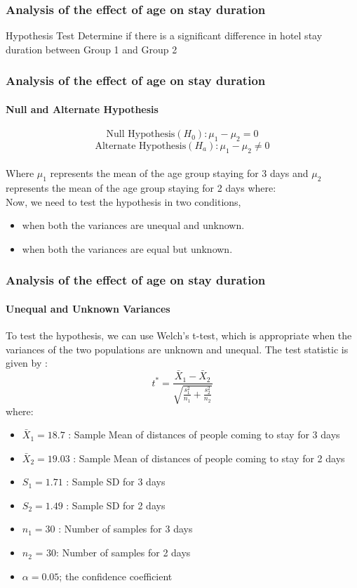 \documentclass{beamer}
\begin{document}
\begin{frame}
\frametitle{Analysis of the effect of age on
stay duration}
\begin{block}{Hypothesis Test}
Determine if there is a significant difference in hotel stay duration between Group 1 and Group 2
\end{block}
\end{frame}

\begin{frame}
\frametitle{Analysis of the effect of age on
stay duration}
\framesubtitle{Null and Alternate Hypothesis}
$$\text{Null Hypothesis}(H_0): \mu_1 - \mu_2 = 0$$
$$\text{Alternate Hypothesis}(H_a): \mu_1 - \mu_2 \neq 0$$\\
\vspace{5mm}
Where $\mu_1$ represents the mean of the age group staying for 3 days and $\mu_2$ represents the mean of the age group staying for 2 days
where:
\\ \vspace{5mm}
Now, we need to test the hypothesis in two conditions,
\begin{itemize}
    \item when both the variances are unequal and unknown.
    \item when both the variances are equal but unknown.
\end{itemize}

\end{frame}

\begin{frame}
\frametitle{Analysis of the effect of age on
stay duration}
\framesubtitle{Unequal and Unknown Variances}
To test the hypothesis, we can use Welch’s t-test, which is appropriate when the variances of the two populations are unknown and unequal. The test statistic is given by :
\[ t^* = \frac{\bar{X}_1 - \bar{X}_2}{\sqrt{\frac{s_1^2}{n_1} + \frac{s_2^2}{n_2}}} \]
where:
\begin{itemize}
    \item $\bar{X}_1 = 18.7$ : Sample Mean of distances of people coming to stay for 3 days
    \item $\bar{X}_2 = 19.03$ : Sample Mean of distances of people coming to stay for 2 days
    \item $S_1 = 1.71$ : Sample SD for 3 days
    \item $S_2 = 1.49$ : Sample SD for 2 days
    \item $n_1 = 30$ : Number of samples for 3 days 
    \item $n_2$ = 30: Number of samples for 2 days
    \item $\alpha = 0.05$; the confidence coefficient
\end{itemize}
\end{frame}
\end{document}
